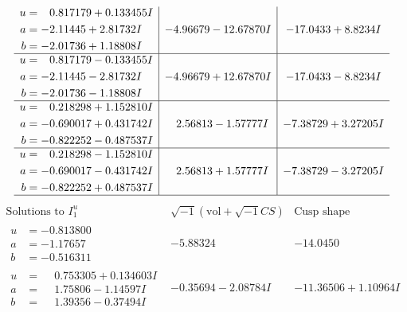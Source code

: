 \documentclass[1p]{elsarticle_modified}
\theoremstyle{definition}
\newcommand{\I}{\sqrt{-1}}
\begin{document}
$$\begin{array}{c|c|c}
\begin{aligned}
u &= \phantom{-}0.817179 + 0.133455 I \\
a &= -2.11445 + 2.81732 I \\
b &= -2.01736 + 1.18808 I\end{aligned}
 & -4.96679 - 12.67870 I & -17.0433 + 8.8234 I \\ \hline\begin{aligned}
u &= \phantom{-}0.817179 - 0.133455 I \\
a &= -2.11445 - 2.81732 I \\
b &= -2.01736 - 1.18808 I\end{aligned}
 & -4.96679 + 12.67870 I & -17.0433 - 8.8234 I \\ \hline\begin{aligned}
u &= \phantom{-}0.218298 + 1.152810 I \\
a &= -0.690017 + 0.431742 I \\
b &= -0.822252 - 0.487537 I\end{aligned}
 & \phantom{-}2.56813 - 1.57777 I & -7.38729 + 3.27205 I \\ \hline\begin{aligned}
u &= \phantom{-}0.218298 - 1.152810 I \\
a &= -0.690017 - 0.431742 I \\
b &= -0.822252 + 0.487537 I\end{aligned}
 & \phantom{-}2.56813 + 1.57777 I & -7.38729 - 3.27205 I\\
 \hline 
 \end{array}$$\newpage$$\begin{array}{c|c|c}  
\text{Solutions to }I^u_{1}& \I (\text{vol} + \sqrt{-1}CS) & \text{Cusp shape}\\
 \hline 
\begin{aligned}
u &= -0.813800\phantom{ +0.000000I} \\
a &= -1.17657\phantom{ +0.000000I} \\
b &= -0.516311\phantom{ +0.000000I}\end{aligned}
 & -5.88324\phantom{ +0.000000I} & -14.0450\phantom{ +0.000000I} \\ \hline\begin{aligned}
u &= \phantom{-}0.753305 + 0.134603 I \\
a &= \phantom{-}1.75806 - 1.14597 I \\
b &= \phantom{-}1.39356 - 0.37494 I\end{aligned}
 & -0.35694 - 2.08784 I & -11.36506 + 1.10964 I \\ \hline\begin{aligned}

\end{aligned}
\end{array}$$
\end{document}
